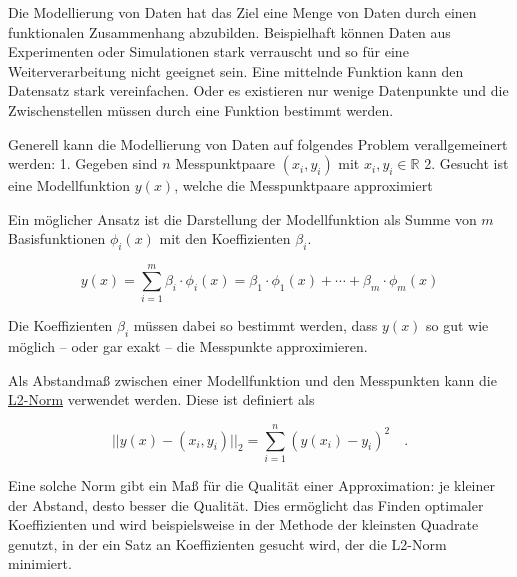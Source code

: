 \documentclass[
  letterpaper,
  DIV=11,
  numbers=noendperiod]{scrreprt}
\begin{document}
\begin{tcolorbox}[enhanced jigsaw, colback=white, bottomrule=.15mm, colframe=quarto-callout-note-color-frame, opacitybacktitle=0.6, breakable, titlerule=0mm, rightrule=.15mm, opacityback=0, coltitle=black, left=2mm, bottomtitle=1mm, toprule=.15mm, arc=.35mm, leftrule=.75mm, colbacktitle=quarto-callout-note-color!10!white, toptitle=1mm, title=\textcolor{quarto-callout-note-color}{\faInfo}\hspace{0.5em}{Theorie - Modellierung}]

Die Modellierung von Daten hat das Ziel eine Menge von Daten durch einen
funktionalen Zusammenhang abzubilden. Beispielhaft können Daten aus
Experimenten oder Simulationen stark verrauscht und so für eine
Weiterverarbeitung nicht geeignet sein. Eine mittelnde Funktion kann den
Datensatz stark vereinfachen. Oder es existieren nur wenige Datenpunkte
und die Zwischenstellen müssen durch eine Funktion bestimmt werden.

Generell kann die Modellierung von Daten auf folgendes Problem
verallgemeinert werden: 1. Gegeben sind \(n\) Messpunktpaare
\((x_i, y_i)\) mit \(x_i, y_i \in \mathbb{R}\) 2. Gesucht ist eine
Modellfunktion \(y(x)\), welche die Messpunktpaare approximiert

Ein möglicher Ansatz ist die Darstellung der Modellfunktion als Summe
von \(m\) Basisfunktionen \(\phi_i(x)\) mit den Koeffizienten
\(\beta_i\).

\[  y(x) = \sum_{i=1}^{m}\beta_i \cdot \phi_i(x) = \beta_1\cdot \phi_1(x) + \cdots + \beta_m\cdot \phi_m(x) \]

Die Koeffizienten \(\beta_i\) müssen dabei so bestimmt werden, dass
\(y(x)\) so gut wie möglich -- oder gar exakt -- die Messpunkte
approximieren.

Als Abstandmaß zwischen einer Modellfunktion und den Messpunkten kann
die \href{https://de.wikipedia.org/wiki/Folgenraum\#lp}{L2-Norm}
verwendet werden. Diese ist definiert als

\[  || y(x) - (x_i, y_i) ||_2 = \sum_{i=1}^n \left(y(x_i) - y_i\right)^2 \quad .\]

Eine solche Norm gibt ein Maß für die Qualität einer Approximation: je
kleiner der Abstand, desto besser die Qualität. Dies ermöglicht das
Finden optimaler Koeffizienten und wird beispielsweise in der Methode
der kleinsten Quadrate genutzt, in der ein Satz an Koeffizienten gesucht
wird, der die L2-Norm minimiert.

\end{tcolorbox}
\end{document}
